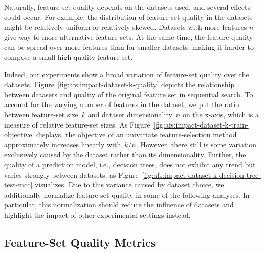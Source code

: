 \documentclass{article}
\theoremstyle{definition}
\begin{document}
Naturally, feature-set quality depends on the datasets used, and several effects could occur.
For example, the distribution of feature-set quality in the datasets might be relatively uniform or relatively skewed.
Datasets with more features $n$ give way to more alternative feature sets.
At the same time, the feature quality can be spread over more features than for smaller datasets, making it harder to compose a small high-quality feature set.

Indeed, our experiments show a broad variation of feature-set quality over the datasets.
Figure~\ref{fig:afs:impact-dataset-k-quality} depicts the relationship between datasets and quality of the original feature set in sequential search.
To account for the varying number of features in the dataset, we put the ratio between feature-set size~$k$ and dataset dimensionality~$n$ on the x-axis, which is a measure of relative feature-set sizes.
As Figure~\ref{fig:afs:impact-dataset-k-train-objective} displays, the objective of an univariate feature-selection method approximately increases linearly with~$k/n$.
However, there still is some variation exclusively caused by the dataset rather than its dimensionality.
Further, the quality of a prediction model, i.e., decision trees, does not exhibit any trend but varies strongly between datasets, as Figure~\ref{fig:afs:impact-dataset-k-decision-tree-test-mcc} visualizes.
Due to this variance caused by dataset choice, we additionally normalize feature-set quality in some of the following analyses.
In particular, this normalization should reduce the influence of datasets and highlight the impact of other experimental settings instead.

\subsection{Feature-Set Quality Metrics}
\label{sec:afs:evaluation:metrics}
\end{document}
